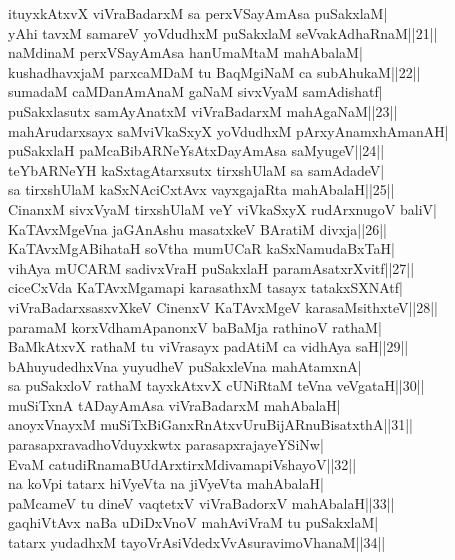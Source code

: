 \documentclass{article}
\begin{document}
ituyxkAtxvX viVraBadarxM sa perxVSayAmAsa puSakxlaM|\\
yAhi tavxM samareV yoVdudhxM puSakxlaM seVvakAdhaRnaM||21||\\
naMdinaM perxVSayAmAsa hanUmaMtaM mahAbalaM|\\
kushadhavxjaM parxcaMDaM tu BaqMgiNaM ca subAhukaM||22||\\
sumadaM caMDanAmAnaM gaNaM sivxVyaM samAdishatf|\\
puSakxlasutx samAyAnatxM viVraBadarxM mahAgaNaM||23||\\
mahArudarxsayx  saMviVkaSxyX yoVdudhxM pArxyAnamxhAmanAH|\\
puSakxlaH paMcaBibARNeYsAtxDayAmAsa saMyugeV||24||\\
teYbARNeYH kaSxtagAtarxsutx tirxshUlaM sa samAdadeV|\\
sa tirxshUlaM kaSxNAciCxtAvx vayxgajaRta mahAbalaH||25||\\
CinanxM sivxVyaM tirxshUlaM veY viVkaSxyX rudArxnugoV baliV|\\
KaTAvxMgeVna jaGAnAshu masatxkeV BAratiM divxja||26||\\
KaTAvxMgABihataH soVtha mumUCaR kaSxNamudaBxTaH|\\
vihAya mUCARM sadivxVraH puSakxlaH paramAsatxrXvitf||27||\\
ciceCxVda KaTAvxMgamapi karasathxM tasayx tatakxSXNAtf|\\
viVraBadarxsasxvXkeV CinenxV KaTAvxMgeV karasaMsithxteV||28||\\
paramaM korxVdhamApanonxV baBaMja rathinoV rathaM|\\
BaMkAtxvX rathaM tu viVrasayx padAtiM ca vidhAya saH||29||\\
bAhuyudedhxVna yuyudheV puSakxleVna mahAtamxnA|\\
sa puSakxloV rathaM tayxkAtxvX cUNiRtaM teVna veVgataH||30||\\
muSiTxnA tADayAmAsa viVraBadarxM mahAbalaH|\\
anoyxVnayxM muSiTxBiGanxRnAtxvUruBijARnuBisatxthA||31||\\
parasapxravadhoVduyxkwtx parasapxrajayeYSiNw|\\
EvaM catudiRnamaBUdArxtirxMdivamapiVshayoV||32||\\
na koVpi tatarx hiVyeVta na jiVyeVta mahAbalaH|\\
paMcameV tu dineV vaqtetxV viVraBadorxV mahAbalaH||33||\\
gaqhiVtAvx naBa uDiDxVnoV mahAviVraM tu puSakxlaM|\\
tatarx yudadhxM tayoVrAsiVdedxVvAsuravimoVhanaM||34||\\
\end{document}
